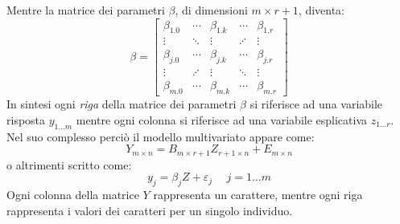 \documentclass[a4page, 11pt]{article} %
\begin{document}
Mentre la matrice dei parametri $\beta$, di dimensioni $m \times r+1$, diventa:
\begin{equation*}
\beta =
\begin{bmatrix}
   \beta_{1.0} & \cdots & \beta_{1.k} & \cdots & \beta_{1.r} \\
   \vdots      & \ddots & \vdots      & \iddots & \vdots \\
   \beta_{j.0} & \cdots & \beta_{j.k} & \cdots & \beta_{j.r} \\
   \vdots      & \iddots& \vdots      & \ddots & \vdots \\
   \beta_{m.0} & \cdots & \beta_{m.k} & \cdots & \beta_{m.r} 
\end{bmatrix}
\end{equation*}
In sintesi ogni \textit{riga} della matrice dei parametri $\beta$ si riferisce ad una variabile risposta $y_{1 \dots m}$ mentre ogni colonna si riferisce ad una variabile esplicativa $z_{1 \dots r}$. 
\newline
Nel suo complesso perciò il modello multivariato appare come:
\begin{equation*}
  Y_{m \times n} = B_{m \times r + 1} Z_{r+1 \times n} + E_{m \times n}
\end{equation*}
o altrimenti scritto come:
\begin{equation*}
  y_j = \beta_j Z + \varepsilon_j \hspace{15pt} j = 1 \dots m
\end{equation*}
Ogni colonna della matrice $Y$ rappresenta un carattere, mentre ogni riga rappresenta i valori dei caratteri per un singolo individuo.
\end{document}
